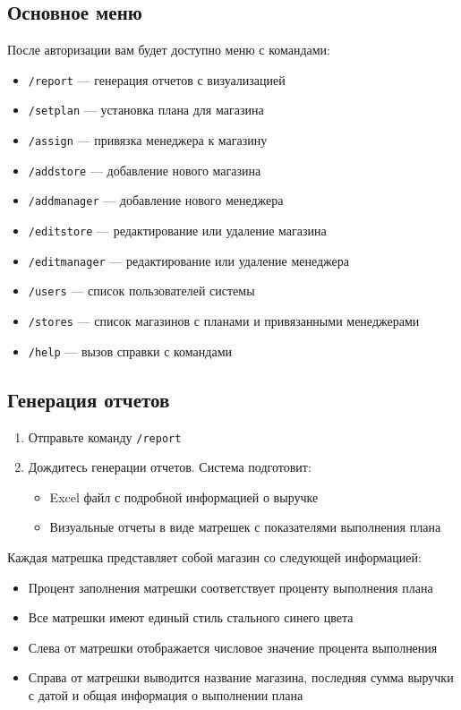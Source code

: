 \documentclass[a4paper,12pt]{article}
\begin{document}
\subsection{Основное меню}
После авторизации вам будет доступно меню с командами:
\begin{itemize}
    \item \texttt{/report} — генерация отчетов с визуализацией
    \item \texttt{/setplan} — установка плана для магазина
    \item \texttt{/assign} — привязка менеджера к магазину
    \item \texttt{/addstore} — добавление нового магазина
    \item \texttt{/addmanager} — добавление нового менеджера
    \item \texttt{/editstore} — редактирование или удаление магазина
    \item \texttt{/editmanager} — редактирование или удаление менеджера
    \item \texttt{/users} — список пользователей системы
    \item \texttt{/stores} — список магазинов с планами и привязанными менеджерами
    \item \texttt{/help} — вызов справки с командами
\end{itemize}

\subsection{Генерация отчетов}
\begin{enumerate}
    \item Отправьте команду \texttt{/report}
    \item Дождитесь генерации отчетов. Система подготовит:
    \begin{itemize}
        \item Excel файл с подробной информацией о выручке
        \item Визуальные отчеты в виде матрешек с показателями выполнения плана
    \end{itemize}
\end{enumerate}

\begin{tcolorbox}[colback=green!5, title=Информация о визуальных отчетах]
Каждая матрешка представляет собой магазин со следующей информацией:
\begin{itemize}
    \item Процент заполнения матрешки соответствует проценту выполнения плана
    \item Все матрешки имеют единый стиль стального синего цвета
    \item Слева от матрешки отображается числовое значение процента выполнения
    \item Справа от матрешки выводится название магазина, последняя сумма выручки с датой и общая информация о выполнении плана
\end{itemize}
\end{tcolorbox}
\end{document}
